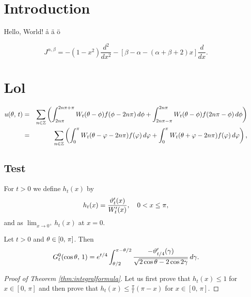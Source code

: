 \section{Introduction}
Hello, World! å ä ö

\begin{equation}
J^{\alpha,\beta} = -(1-x^2) \frac{d^2}{dx^2} - [\beta - \alpha - (\alpha + \beta +2)x]\frac{d}{dx}.
\end{equation}

\section{Lol}

\begin{eqnarray}
u(\theta,\, t) &=& \sum_{n \in \mathbb{Z}} \left( \int_{2n\pi}^{2n\pi+\pi} W_t(\theta-\phi)f(\phi-2n\pi) \, d \phi + \int_{2n\pi - \pi}^{2n\pi}W_t(\theta-\phi)  f(2n\pi - \phi)\, d \phi \right)\nonumber\\
&=& \sum_{n \in \mathbb{Z}} \left( \int_{0}^{\pi} W_t(\theta-\varphi-2n\pi) f(\varphi)\, d \varphi + \int_{0}^{\pi}W_t(\theta+\varphi-2 n \pi)  f(\varphi) \, d \varphi \right)\nonumber,
\end{eqnarray}

\subsection{Test}

\begin{defi}
For $t>0$ we define $h_t(x)$ by
\begin{displaymath}
h_t(x)=\frac{\vartheta'_t(x)}{ W'_t(x)}, \quad  0 < x \leq \pi,
\end{displaymath}
and as $\lim_{x \rightarrow 0^+}h_t(x)$ at $x=0$.
\end{defi}


\begin{thm}\label{thm:integralformula}
Let $t>0$ and $\theta \in [0,\,\pi]$. Then
\begin{equation}\label{eq:estimationsintegral}
G^{0}_t(\cos\theta,\,1) =e^{t/4} \int_{\theta/2}^{\pi-\theta/2} \frac{ -\vartheta'_{t/4}(\gamma)  }{\sqrt{2\cos \theta - 2\cos 2\gamma}} \, d \gamma.
\end{equation}
\end{thm}


\begin{proof}[Proof of Theorem \ref{thm:integralformula}]
Let us first prove that $h_t(x) \leq 1$ for $x\in [0,\,\pi]$ and then prove that $h_t(x) \leq \frac{\pi}{t}(\pi -x) $ for $x\in [0,\,\pi]$.
\end{proof}
